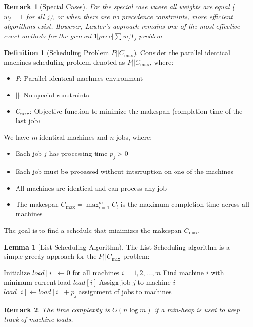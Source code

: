 \documentclass{article}
\newtheorem{remark}{Remark}
\theoremstyle{definition}
\newtheorem{lemma}{Lemma}
\newtheorem{definition}{Definition}
\begin{document}
\begin{remark}[Special Cases]
For the special case where all weights are equal ($w_j = 1$ for all $j$), or when there are no precedence constraints, more efficient algorithms exist. However, Lawler's approach remains one of the most effective exact methods for the general $1|prec|\sum w_jT_j$ problem.
\end{remark}


\begin{definition}[Scheduling Problem $P||C_{\max}$]
Consider the parallel identical machines scheduling problem denoted as $P||C_{\max}$, where:
\begin{itemize}
    \item $P$: Parallel identical machines environment
    \item $||$: No special constraints
    \item $C_{\max}$: Objective function to minimize the makespan (completion time of the last job)
\end{itemize}

We have $m$ identical machines and $n$ jobs, where:
\begin{itemize}
    \item Each job $j$ has processing time $p_j > 0$
    \item Each job must be processed without interruption on one of the machines
    \item All machines are identical and can process any job
    \item The makespan $C_{\max} = \max_{i=1}^{m} C_i$ is the maximum completion time across all machines
\end{itemize}

The goal is to find a schedule that minimizes the makespan $C_{\max}$.
\end{definition}

\begin{lemma}[List Scheduling Algorithm]
The List Scheduling algorithm is a simple greedy approach for the $P||C_{\max}$ problem:

\begin{algorithm}
\caption{List Scheduling}
\begin{algorithmic}[1]
    \State Initialize $load[i] \gets 0$ for all machines $i = 1, 2, \ldots, m$ 
     
        \State Find machine $i$ with minimum current load $load[i]$
        \State Assign job $j$ to machine $i$
        \State $load[i] \gets load[i] + p_j$ 
    \EndFor
    \State \Return assignment of jobs to machines
\EndProcedure
\end{algorithmic}
\end{algorithm}

\begin{remark}
The time complexity is $O(n \log m)$ if a min-heap is used to keep track of machine loads.
\end{remark}
\end{lemma}
\end{document}
